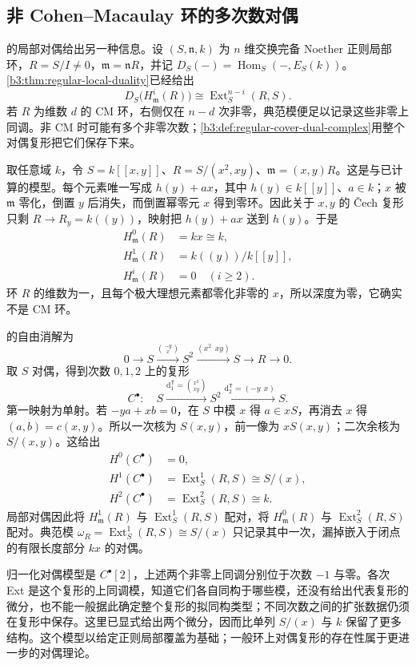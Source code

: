 \subsection{非 Cohen--Macaulay 环的多次数对偶}
\label{b3:subsec:C04:03}

的局部对偶给出另一种信息。设 \((S,\mathfrak n,k)\) 为 \(n\) 维交换完备 Noether 正则局部环，\(R=S/I\ne0\)，\(\mathfrak m=\mathfrak nR\)，并记 \(D_S(-)=\operatorname{Hom}_S(-,E_S(k))\)。\cref{b3:thm:regular-local-duality}已经给出
\[
	D_S\bigl(H_{\mathfrak m}^i(R)\bigr) \cong\operatorname{Ext}_S^{n-i}(R,S).
\]
若 \(R\) 为维数 \(d\) 的 CM 环，右侧仅在 \(n-d\) 次非零，典范模便足以记录这些非零上同调。非 CM 时可能有多个非零次数；\cref{b3:def:regular-cover-dual-complex}用整个对偶复形把它们保存下来。

\ProseParagraphBreak
取任意域 \(k\)，令 \(S=k[\![x,y]\!]\)、\(R=S/(x^2,xy)\)、\(\mathfrak m=(x,y)R\)。这是与已计算的模型。每个元素唯一写成 \(h(y)+ax\)，其中 \(h(y)\in k[\![y]\!]\)、\(a\in k\)；\(x\) 被 \(\mathfrak m\) 零化，倒置 \(y\) 后消失，而倒置幂零元 \(x\) 得到零环。因此关于 \(x,y\) 的 Čech 复形只剩 \(R\to R_y=k(\!(y)\!)\)，映射把 \(h(y)+ax\) 送到 \(h(y)\)。于是
\[
	\begin{aligned}
		H^0_{\mathfrak m}(R)&=kx\cong k,\\
		H^1_{\mathfrak m}(R)&=k(\!(y)\!)/k[\![y]\!],\\
		H^i_{\mathfrak m}(R)&=0\quad(i\ge2).
	\end{aligned}
\]
环 \(R\) 的维数为一，且每个极大理想元素都零化非零的 \(x\)，所以深度为零，它确实不是 CM 环。

\ProseParagraphBreak
{}的自由消解为
\[
	0\longrightarrow S\xrightarrow{\binom{-y}{x}}S^2 \xrightarrow{(x^2\ \ xy)}S\longrightarrow R\longrightarrow0.
\]
取 \(S\) 对偶，得到次数 \(0,1,2\) 上的复形
\[
	C^\bullet:\quad S\xrightarrow{\mathrm{d}_1^{\mathsf T}=\binom{x^2}{xy}}S^2 \xrightarrow{\mathrm{d}_2^{\mathsf T}=(-y\ \ x)}S.
\]
第一映射为单射。若 \(-ya+xb=0\)，在 \(S\) 中模 \(x\) 得 \(a\in xS\)，再消去 \(x\) 得 \((a,b)=c(x,y)\)。所以一次核为 \(S(x,y)\)，前一像为 \(xS(x,y)\)；二次余核为 \(S/(x,y)\)。这给出
\[
	\begin{aligned}
		H^0(C^\bullet)&=0,\\
		H^1(C^\bullet)&=\operatorname{Ext}_S^1(R,S)\cong S/(x),\\
		H^2(C^\bullet)&=\operatorname{Ext}_S^2(R,S)\cong k.
	\end{aligned}
\]
局部对偶因此将 \(H^1_{\mathfrak m}(R)\) 与 \(\operatorname{Ext}_S^1(R,S)\) 配对，将 \(H^0_{\mathfrak m}(R)\) 与 \(\operatorname{Ext}_S^2(R,S)\) 配对。典范模 \(\omega_R=\operatorname{Ext}_S^1(R,S)\cong S/(x)\) 只记录其中一次，漏掉嵌入于闭点的有限长度部分 \(kx\) 的对偶。

\ProseParagraphBreak
归一化对偶模型是 \(C^\bullet[2]\)，上述两个非零上同调分别位于次数 \(-1\) 与零。各次 Ext 是这个复形的上同调模，知道它们各自同构于哪些模，还没有给出代表复形的微分，也不能一般据此确定整个复形的拟同构类型；不同次数之间的扩张数据仍须在复形中保存。这里已显式给出两个微分，因而比单列 \(S/(x)\) 与 \(k\) 保留了更多结构。这个模型以给定正则局部覆盖为基础；一般环上对偶复形的存在性属于更进一步的对偶理论。
